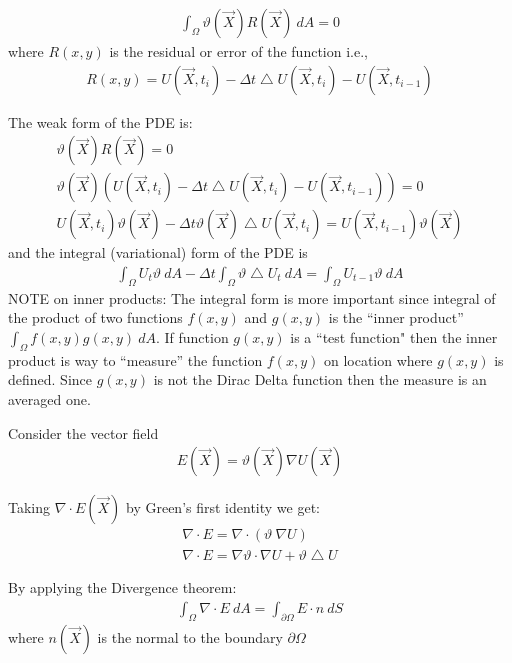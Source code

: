 \documentclass{birkjour}
\numberwithin{equation}{section}
\begin{document}
\begin{eqnarray}
	\int_{\Omega} { \vartheta(\vec X) R(\vec X) \ dA } = 0 \nonumber
\end{eqnarray}
 where $R(x,y)$ is the residual or error of the function i.e., 
\begin{eqnarray}
	R(x,y) = U(\vec X, t_i) - \Delta t \bigtriangleup U(\vec X, t_i) - U(\vec X, t_{i-1}) \nonumber
\end{eqnarray}

The weak form of the PDE is:
\begin{eqnarray}
	\vartheta(\vec X) R(\vec X) = 0 \nonumber\\
	\vartheta(\vec X) (U(\vec X, t_i) - \Delta t \bigtriangleup U(\vec X, t_i) - U(\vec X, t_{i-1})) = 0 \nonumber\\
	U(\vec X, t_i) \vartheta(\vec X) - \Delta t \vartheta(\vec X) \bigtriangleup U(\vec X, t_i) = U(\vec X, t_{i-1}) \vartheta(\vec X) \nonumber
\end{eqnarray}
 and the integral (variational) form of the PDE is
\begin{eqnarray}
	\label{eqn:original_weak_form}
	\int_{\Omega}{ U_t \vartheta \ dA } - \Delta t \int_{\Omega}{ \vartheta \bigtriangleup U_t \ dA} = \int_{\Omega} { U_{t-1} \vartheta \ dA }
\end{eqnarray}
NOTE on inner products: The integral form is more important since integral of the product 
of two functions $f(x,y)$ and $g(x,y)$ is the ``inner product'' $\int_{\Omega}{ f(x,y) g(x,y) \ dA }$.
If function $g(x,y)$ is a ``test function" then the inner product is way to ``measure'' the 
function $f(x,y)$ on location where $g(x,y)$ is defined. Since $g(x,y)$ is not the Dirac Delta 
function then the measure is an averaged one.
 
Consider the vector field
\begin{eqnarray}
	E(\vec X) = \vartheta(\vec X) \nabla U(\vec X)
\end{eqnarray}
 
Taking $\nabla \cdot E(\vec X)$ by Green's first identity we get:
\begin{eqnarray}
	\label{eqn:green_first_identity}
	\nabla \cdot E = \nabla \cdot (\vartheta \ \nabla U) \nonumber\\
	\nabla \cdot E = \nabla \vartheta \cdot \nabla U + \vartheta \bigtriangleup U
\end{eqnarray} 

By applying the Divergence theorem:
\begin{eqnarray}
	\label{eqn:divergence_theorem}
	\int_{\Omega} {\nabla \cdot E \ dA} = \int_{\partial \Omega} { E \cdot n  \ dS }
\end{eqnarray}
where $n(\vec X)$ is the normal to the boundary $\partial \Omega$
\end{document}
